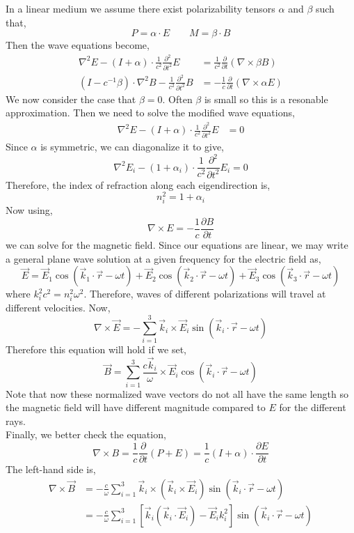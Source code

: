 \documentclass[12pt]{extarticle}
\newcommand{\pderiv}[2]{\frac{\partial{#1}}{\partial{#2}}}
\newcommand{\npar}[3]{\frac{\partial^{#1}{#2}}{\partial{#3}^{#1}}}
\theoremstyle{definition}
\begin{document}
In a linear medium we assume there exist polarizability tensors $\alpha$ and $\beta$ such that,
\[ P = \alpha \cdot E \quad \quad M = \beta \cdot B \]
Then the wave equations become,
\begin{align*}
\nabla^2 E - (I + \alpha) \cdot \frac{1}{c^2} \npar{2}{}{t} E & = \frac{1}{c^2} \pderiv{}{t} (\nabla \times \beta B)
\\
(I - c^{-1} \beta) \cdot \nabla^2 B - \frac{1}{c^2} \npar{2}{}{t} B & = - \frac{1}{c} \pderiv{}{t} (\nabla \times \alpha E)
\end{align*}
We now consider the case that $\beta = 0$. Often $\beta$ is small so this is a resonable approximation. Then we need to solve the modified wave equations,
\begin{align*}
\nabla^2 E - (I + \alpha) \cdot \frac{1}{c^2} \npar{2}{}{t} E & = 0 
\end{align*}
Since $\alpha$ is symmetric, we can diagonalize it to give,
\[ \nabla^2 E_i - (1 + \alpha_i) \cdot \frac{1}{c^2} \npar{2}{}{t} E_i  = 0 \]
Therefore, the index of refraction along each eigendirection is,
\[ n_i^2 = 1 + \alpha_i \]
Now using,
\[ \nabla \times E = - \frac{1}{c} \pderiv{B}{t} \]
we can solve for the magnetic field. Since our equations are linear, we may write a general plane wave solution at a given frequency for the electric field as,
\[ \vec{E} = \vec{E}_1 \cos{(\vec{k}_1 \cdot \vec{r} - \omega t)} + \vec{E}_2 \cos{(\vec{k}_2 \cdot \vec{r} - \omega t)} + \vec{E}_3 \cos{(\vec{k}_3 \cdot \vec{r} - \omega t)} \]
where $k_i^2 c^2 = n_i^2 \omega^2$. Therefore, waves of different polarizations will travel at different velocities. Now,
\[ \nabla \times \vec{E} = - \sum_{i = 1}^3 \vec{k}_i \times \vec{E}_i \sin{(\vec{k}_i \cdot \vec{r} - \omega t)} \]
Therefore this equation will hold if we set,
\[ \vec{B} = \sum_{i = 1}^3 \frac{c \vec{k}_i}{\omega} \times \vec{E}_i \cos{(\vec{k}_i \cdot \vec{r} - \omega t)} \]
Note that now these normalized wave vectors do not all have the same length so the magnetic field will have different magnitude compared to $E$ for the different rays.
\bigskip\\
Finally, we better check the equation,
\[ \nabla \times B = \frac{1}{c} \pderiv{}{t} (P + E) = \frac{1}{c} (I + \alpha) \cdot \pderiv{E}{t} \]
The left-hand side is,
\begin{align*}
\nabla \times \vec{B} & = - \frac{c}{\omega} \sum_{i = 1}^3 \vec{k}_i \times (\vec{k}_i \times \vec{E}_i) \sin{(\vec{k}_i \cdot \vec{r} - \omega t)}
\\
& = - \frac{c}{\omega} \sum_{i = 1}^3 [\vec{k}_i (\vec{k}_i \cdot \vec{E}_i) - \vec{E}_i k_i^2]   \sin{(\vec{k}_i \cdot \vec{r} - \omega t)}
\end{align*}
\end{document}
